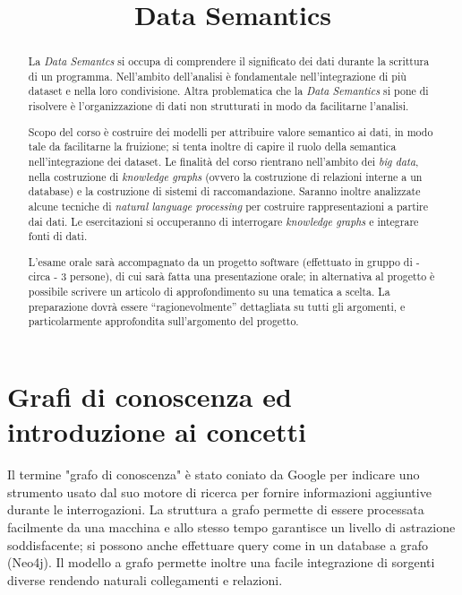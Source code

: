 \documentclass[11pt]{article}
\title{\textbf{Data Semantics}}
\author{}
\date{}
\begin{document}
\maketitle
\begin{abstract}
  La \textit{Data Semantcs} si occupa di comprendere il significato dei dati durante la scrittura di un programma.
  Nell'ambito dell'analisi è fondamentale nell'integrazione di più dataset e nella loro condivisione.
  Altra problematica che la \textit{Data Semantics} si pone di risolvere è l'organizzazione di dati non strutturati in modo da facilitarne l'analisi.
  
  Scopo del corso è costruire dei modelli per attribuire valore semantico ai dati, in modo tale da facilitarne la fruizione; si tenta inoltre di capire il ruolo della semantica nell'integrazione dei dataset.
  Le finalità del corso rientrano nell'ambito dei \textit{big data}, nella costruzione di \textit{knowledge graphs} (ovvero la costruzione di relazioni interne a un database) e la costruzione di sistemi di raccomandazione.
  Saranno inoltre analizzate alcune tecniche di \textit{natural language processing} per costruire rappresentazioni a partire dai dati. \newline
  Le esercitazioni si occuperanno di interrogare \textit{knowledge graphs} e integrare fonti di dati.

  L'esame orale sarà accompagnato da un progetto software (effettuato in gruppo di - circa - 3 persone), di cui sarà fatta una presentazione orale; in alternativa al progetto è possibile scrivere un articolo di approfondimento su una tematica a scelta.
  La preparazione dovrà essere ``ragionevolmente'' dettagliata su tutti gli argomenti, e particolarmente approfondita sull'argomento del progetto.
\end{abstract}

\newpage
\tableofcontents

\newpage
\part{Grafi di conoscenza ed introduzione ai concetti}
Il termine "grafo di conoscenza" è stato coniato da Google per indicare uno strumento usato dal suo motore di ricerca per fornire informazioni aggiuntive durante le interrogazioni.
La struttura a grafo permette di essere processata facilmente da una macchina e allo stesso tempo garantisce un livello di astrazione soddisfacente; si possono anche effettuare query come in un database a grafo (Neo4j).
Il modello a grafo permette inoltre una facile integrazione di sorgenti diverse rendendo naturali collegamenti e relazioni.
\end{document}
